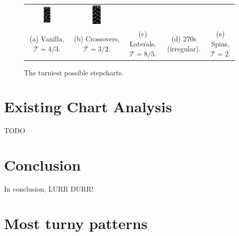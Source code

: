 \documentclass[10pt]{sigplanconf}
\begin{document}
\begin{figure}[t]
\begin{center}
\begin{tabular}{ccccc}
		\includegraphics[width=0.17\textwidth]{result-irregular-270.png} &
		\includegraphics[width=0.17\textwidth]{result-2-spin.png} \\
		\small (a) Vanilla, $\mathcal{T}=4/3$. &
		\small (b) Crossovers, $\mathcal{T}=3/2$. &
		\small (c) Laterals, $\mathcal{T}=8/5$. &
		\small (d) 270s (irregular). &
		\small (e) Spins, $\mathcal{T}=2$.
	\end{tabular}
	\end{center}
	\caption{The turniest possible stepcharts.}
	\label{fig:sequences}
\end{figure}

\section{Existing Chart Analysis}

TODO %

\section{Conclusion}

In conclusion, LURR DURR!




\appendix


\section{Most turny patterns}
\end{document}
